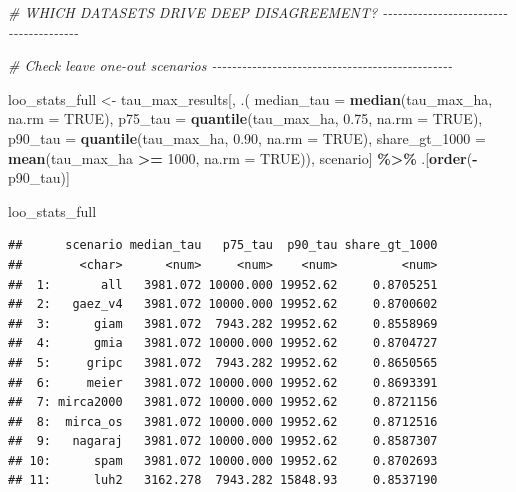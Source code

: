 \documentclass[
  11pt,
]{article}
\newenvironment{Shaded}{\begin{snugshade}}{\end{snugshade}}
\newcommand{\AttributeTok}[1]{\textcolor[rgb]{0.13,0.29,0.53}{#1}}
\newcommand{\CommentTok}[1]{\textcolor[rgb]{0.56,0.35,0.01}{\textit{#1}}}
\newcommand{\ConstantTok}[1]{\textcolor[rgb]{0.56,0.35,0.01}{#1}}
\newcommand{\DecValTok}[1]{\textcolor[rgb]{0.00,0.00,0.81}{#1}}
\newcommand{\FloatTok}[1]{\textcolor[rgb]{0.00,0.00,0.81}{#1}}
\newcommand{\FunctionTok}[1]{\textcolor[rgb]{0.13,0.29,0.53}{\textbf{#1}}}
\newcommand{\NormalTok}[1]{#1}
\newcommand{\OtherTok}[1]{\textcolor[rgb]{0.56,0.35,0.01}{#1}}
\newcommand{\SpecialCharTok}[1]{\textcolor[rgb]{0.81,0.36,0.00}{\textbf{#1}}}
\begin{document}
\begin{Shaded}
\begin{Highlighting}[]
\CommentTok{\# WHICH DATASETS DRIVE DEEP DISAGREEMENT? {-}{-}{-}{-}{-}{-}{-}{-}{-}{-}{-}{-}{-}{-}{-}{-}{-}{-}{-}{-}{-}{-}{-}{-}{-}{-}{-}{-}{-}{-}{-}{-}{-}{-}{-}{-}{-}{-}{-}}

\CommentTok{\# Check leave one{-}out scenarios {-}{-}{-}{-}{-}{-}{-}{-}{-}{-}{-}{-}{-}{-}{-}{-}{-}{-}{-}{-}{-}{-}{-}{-}{-}{-}{-}{-}{-}{-}{-}{-}{-}{-}{-}{-}{-}{-}{-}{-}{-}{-}{-}{-}{-}{-}{-}{-}}

\NormalTok{loo\_stats\_full }\OtherTok{\textless{}{-}}\NormalTok{ tau\_max\_results[, .(}
    \AttributeTok{median\_tau =} \FunctionTok{median}\NormalTok{(tau\_max\_ha, }\AttributeTok{na.rm =} \ConstantTok{TRUE}\NormalTok{),}
    \AttributeTok{p75\_tau =} \FunctionTok{quantile}\NormalTok{(tau\_max\_ha, }\FloatTok{0.75}\NormalTok{, }\AttributeTok{na.rm =} \ConstantTok{TRUE}\NormalTok{),}
    \AttributeTok{p90\_tau =} \FunctionTok{quantile}\NormalTok{(tau\_max\_ha, }\FloatTok{0.90}\NormalTok{, }\AttributeTok{na.rm =} \ConstantTok{TRUE}\NormalTok{),}
    \AttributeTok{share\_gt\_1000 =} \FunctionTok{mean}\NormalTok{(tau\_max\_ha }\SpecialCharTok{\textgreater{}=} \DecValTok{1000}\NormalTok{, }\AttributeTok{na.rm =} \ConstantTok{TRUE}\NormalTok{)),}
\NormalTok{    scenario] }\SpecialCharTok{\%\textgreater{}\%}
\NormalTok{  .[}\FunctionTok{order}\NormalTok{(}\SpecialCharTok{{-}}\NormalTok{p90\_tau)]}

\NormalTok{loo\_stats\_full}
\end{Highlighting}
\end{Shaded}

\begin{verbatim}
##      scenario median_tau   p75_tau  p90_tau share_gt_1000
##        <char>      <num>     <num>    <num>         <num>
##  1:       all   3981.072 10000.000 19952.62     0.8705251
##  2:   gaez_v4   3981.072 10000.000 19952.62     0.8700602
##  3:      giam   3981.072  7943.282 19952.62     0.8558969
##  4:      gmia   3981.072 10000.000 19952.62     0.8704727
##  5:     gripc   3981.072  7943.282 19952.62     0.8650565
##  6:     meier   3981.072 10000.000 19952.62     0.8693391
##  7: mirca2000   3981.072 10000.000 19952.62     0.8721156
##  8:  mirca_os   3981.072 10000.000 19952.62     0.8712516
##  9:   nagaraj   3981.072 10000.000 19952.62     0.8587307
## 10:      spam   3981.072 10000.000 19952.62     0.8702693
## 11:      luh2   3162.278  7943.282 15848.93     0.8537190
\end{verbatim}
\end{document}
